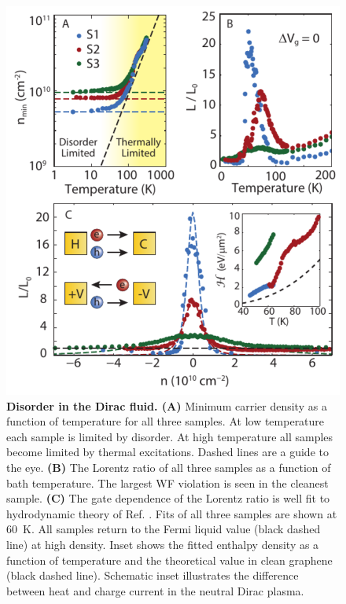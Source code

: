 \begin{figure}
\includegraphics[width=\columnwidth]{figures/Dirac_fluid/Fig3.pdf}
\caption{\textbf{Disorder in the Dirac fluid.  (A)} Minimum carrier density as a function of temperature for all three samples.  At low temperature each sample is limited by disorder. At high temperature all samples become limited by thermal excitations.  Dashed lines are a guide to the eye. \textbf{(B)} The Lorentz ratio of all three samples as a function of bath temperature. The largest WF violation is seen in the cleanest sample. \textbf{(C)} The gate dependence of the Lorentz ratio is well fit to hydrodynamic theory of Ref. \cite{muller_quantum-critical_2008, foster_slow_2009}. Fits of all three samples are shown at 60~K. All samples return to the Fermi liquid value (black dashed line) at high density. Inset shows the fitted enthalpy density as a function of temperature and the theoretical value in clean graphene (black dashed line). Schematic inset illustrates the difference between heat and charge current in the neutral Dirac plasma.}
\label{fig:DF_Fig3}
\end{figure}

